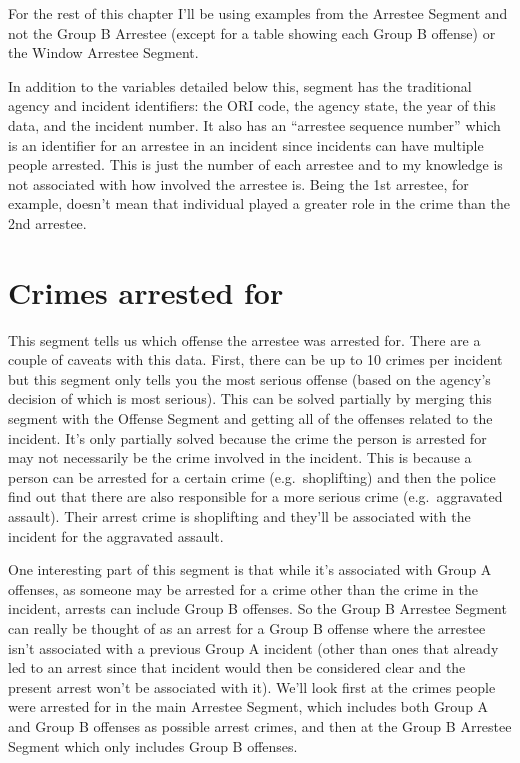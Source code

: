\documentclass[
]{krantz}
\begin{document}
For the rest of this chapter I'll be using examples from the
Arrestee Segment and not the Group B Arrestee (except for a
table showing each Group B offense) or the Window Arrestee
Segment.

In addition to the variables detailed below this, segment
has the traditional agency and incident identifiers: the ORI
code, the agency state, the year of this data, and the
incident number. It also has an ``arrestee sequence number''
which is an identifier for an arrestee in an incident since
incidents can have multiple people arrested. This is just
the number of each arrestee and to my knowledge is not
associated with how involved the arrestee is. Being the 1st
arrestee, for example, doesn't mean that individual played a
greater role in the crime than the 2nd arrestee.

\section{Crimes arrested for}\label{crimes-arrested-for}

This segment tells us which offense the arrestee was
arrested for. There are a couple of caveats with this data.
First, there can be up to 10 crimes per incident but this
segment only tells you the most serious offense (based on
the agency's decision of which is most serious). This can be
solved partially by merging this segment with the Offense
Segment and getting all of the offenses related to the
incident. It's only partially solved because the crime the
person is arrested for may not necessarily be the crime
involved in the incident. This is because a person can be
arrested for a certain crime (e.g.~shoplifting) and then the
police find out that there are also responsible for a more
serious crime (e.g.~aggravated assault). Their arrest crime
is shoplifting and they'll be associated with the incident
for the aggravated assault.

One interesting part of this segment is that while it's
associated with Group A offenses, as someone may be arrested
for a crime other than the crime in the incident, arrests
can include Group B offenses. So the Group B Arrestee
Segment can really be thought of as an arrest for a Group B
offense where the arrestee isn't associated with a previous
Group A incident (other than ones that already led to an
arrest since that incident would then be considered clear
and the present arrest won't be associated with it). We'll
look first at the crimes people were arrested for in the
main Arrestee Segment, which includes both Group A and Group
B offenses as possible arrest crimes, and then at the Group
B Arrestee Segment which only includes Group B offenses.
\end{document}
